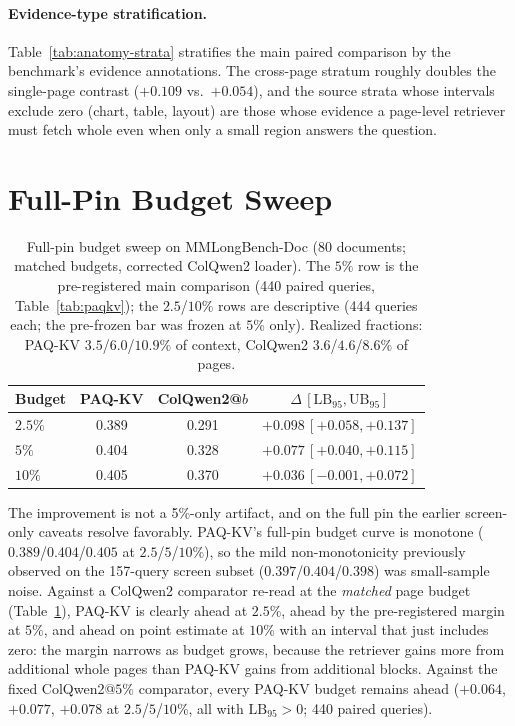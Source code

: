 \documentclass[letterpaper]{article} %
\newcommand{\paqc}{\textsc{PAQ-KV}}
\newcommand{\lb}{\mathrm{LB}_{95}}
\begin{document}
\paragraph{Evidence-type stratification.} Table~\ref{tab:anatomy-strata} stratifies the main paired comparison by the benchmark's evidence annotations. The cross-page stratum roughly doubles the single-page contrast ($+0.109$ vs.\ $+0.054$), and the source strata whose intervals exclude zero (chart, table, layout) are those whose evidence a page-level retriever must fetch whole even when only a small region answers the question.

\section{Full-Pin Budget Sweep}\label{app:budget-sweep}

\begin{table}[t]
\centering\small
\setlength{\tabcolsep}{2.5pt}%
\begin{tabular}{lccc}
\toprule
Budget & \paqc{} & ColQwen2@$b$ & $\Delta\,[\lb,\mathrm{UB}_{95}]$ \\
\midrule
$2.5\%$ & 0.389 & 0.291 & $+0.098\,[+0.058,+0.137]$ \\
$5\%$   & 0.404 & 0.328 & $+0.077\,[+0.040,+0.115]$ \\
$10\%$  & 0.405 & 0.370 & $+0.036\,[-0.001,+0.072]$ \\
\bottomrule
\end{tabular}
\caption{Full-pin budget sweep on MMLongBench-Doc (80 documents; matched budgets, corrected ColQwen2 loader). The $5\%$ row is the pre-registered main comparison (440 paired queries, Table~\ref{tab:paqkv}); the $2.5$/$10\%$ rows are descriptive (444 queries each; the pre-frozen bar was frozen at $5\%$ only). Realized fractions: \paqc{} $3.5$/$6.0$/$10.9\%$ of context, ColQwen2 $3.6$/$4.6$/$8.6\%$ of pages.}
\label{tab:budget-sweep}
\end{table}

The improvement is not a 5\%-only artifact, and on the full pin the earlier screen-only caveats resolve favorably. \paqc{}'s full-pin budget curve is monotone ($0.389$/$0.404$/$0.405$ at $2.5$/$5$/$10\%$), so the mild non-monotonicity previously observed on the 157-query screen subset ($0.397$/$0.404$/$0.398$) was small-sample noise. Against a ColQwen2 comparator re-read at the \emph{matched} page budget (Table~\ref{tab:budget-sweep}), \paqc{} is clearly ahead at $2.5\%$, ahead by the pre-registered margin at $5\%$, and ahead on point estimate at $10\%$ with an interval that just includes zero: the margin narrows as budget grows, because the retriever gains more from additional whole pages than \paqc{} gains from additional blocks. Against the fixed ColQwen2@$5\%$ comparator, every \paqc{} budget remains ahead ($+0.064$, $+0.077$, $+0.078$ at $2.5$/$5$/$10\%$, all with $\lb>0$; 440 paired queries).
\end{document}
